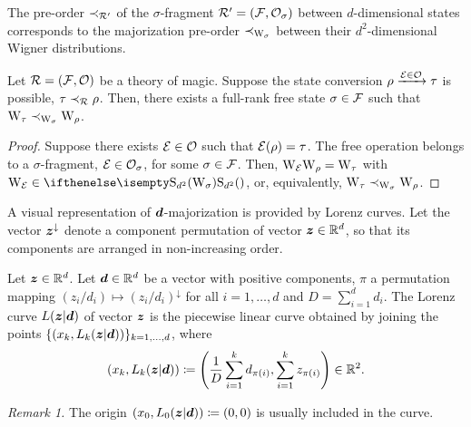 
The pre-order $\prec_{\mathcal{R}'}$ of the $\sigma$-fragment $\mathcal{R}' = (\mathcal{F}, \mathcal{O}_\sigma)$ between $d$-dimensional states corresponds to the majorization pre-order $\prec_{\W{\sigma}}$ between their $d^2$-dimensional Wigner distributions.

\begin{theorem}
    Let $\mathcal{R} = (\mathcal{F}, \mathcal{O})$ be a theory of magic.
    Suppose the state conversion $\rho \xrightarrow{\mathcal{E} \in \mathcal{O}} \tau$ is possible, $\tau \prec_{\mathcal{R}} \rho$.
    Then, there exists a full-rank free state $\sigma \in \mathcal{F}$ such that  $\W{\tau} \prec_{\W{\sigma}} \W{\rho}$.
\end{theorem}
\begin{proof}
    Suppose there exists $\mathcal{E} \in \mathcal{O}$ such that $\mathcal{E}(\rho) = \tau$.
    The free operation belongs to a $\sigma$-fragment, $\mathcal{E} \in \mathcal{O}_\sigma$, for some $\sigma \in \mathcal{F}$.
    Then, $\W{\E}\W{\rho} = \W{\tau}$ with $\W{\E} \in \stochw$, or, equivalently, $\W{\tau} \prec_{\W{\sigma}} \W{\rho}$.
\end{proof}

A visual representation of $\bm{d}$-majorization is provided by Lorenz curves.
Let the vector $\bm{z}^\downarrow$ denote a component permutation of vector $\bm{z} \in \mathbb{R}^d$, so that its components are arranged in non-increasing order.
\begin{definition}
    Let $\bm{z} \in \mathbb{R}^d$.
    Let $\bm{d} \in \mathbb{R}^d$ be a vector with positive components, $\pi$ a permutation mapping $(z_i/d_i) \mapsto (z_i/d_i)^\downarrow$ for all $i=1,\dots,d$ and $D = \sum_{i=1}^d d_i$.
    The Lorenz curve $L(\bm{z}|\bm{d})$ of vector $\bm{z}$ is the piecewise linear curve obtained by joining the points $\{ (x_k, L_k(\bm{z}|\bm{d})) \}_{k=1,\dots,d}$, where
    \begin{equation}\label{eq:lorenz}
        (x_k, L_k(\bm{z}|\bm{d})) \coloneqq \left( \frac{1}{D}\sum_{i=1}^k d_{\pi(i)}, \sum_{i=1}^k z_{\pi(i)} \right) \in \mathbb{R}^2.
    \end{equation}
\end{definition}
\emph{Remark 1.} The origin $(x_0, L_0(\bm{z}|\bm{d})) \coloneqq (0,0)$ is usually included in the curve.

